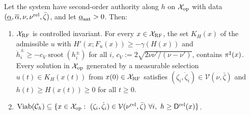 \begin{theorem}\label{thm:sandwich}
Let the system have second-order authority along $h$ on $\mathcal{X}_{\mathrm{op}}$ with data $(\underline{\alpha},\overline{\alpha},\nu,\nu^{\mathrm{rel}},\bar\zeta)$, and let $\underline{\alpha}_{\mathrm{sat}}>0$. Then:
\begin{enumerate}
\item[(i)] $\mathcal{X}_{\mathrm{RF}}$ is controlled invariant. For every $x\in\mathcal{X}_{\mathrm{RF}}$, the set $K_H(x)$ of the admissible $u$ with $H'(x;F_u(x))\ge-\gamma(H(x))$ and $\dot h^{\pm}_i\ge-c_V\operatorname{sroot}(h^{\pm}_i)$ for all $i$, $c_V:=2\sqrt{2\nu\nu'/(\nu-\nu')}$, contains $\pi^{\sharp}(x)$. Every solution in $\mathcal{X}_{\mathrm{op}}$ generated by a measurable selection $u(t)\in K_H(x(t))$ from $x(0)\in\mathcal{X}_{\mathrm{RF}}$ satisfies $(\zeta_i,\dot\zeta_i)\in\mathcal{V}(\nu,\bar\zeta)$ and $h(t)\ge H(x(t))\ge0$ for all $t\ge0$.
\item[(ii)] $\Viab(\mathcal{C}_h)\subseteq\{x\in\Xop:\ (\zeta_i,\dot\zeta_i)\in\mathcal{V}(\nu^{\mathrm{rel}},\bar\zeta)\ \forall i,\ h\ge\Drel(x)\}$.
\end{enumerate}
\end{theorem}
